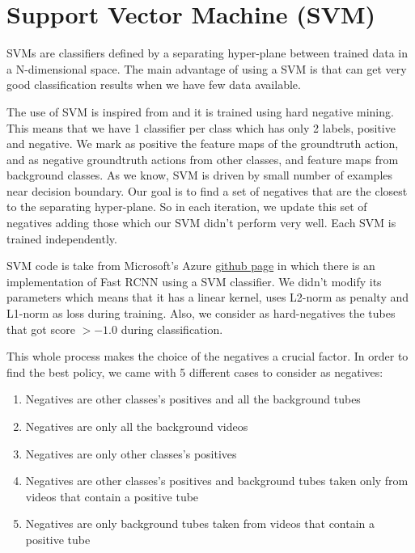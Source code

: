 \section{Support Vector Machine (SVM)}
SVMs are classifiers defined by a separating hyper-plane between trained data in a N-dimensional space. The main advantage of using a SVM
is that can get very good classification results when we have few data available. \par
The use of SVM is inspired from \cite{Girshick:2015:FR:2919332.2920125} and it is trained using hard negative mining. 
This means that we have 1 classifier per class which has only 2 labels, positive and negative. We mark as positive the feature maps of the
groundtruth action, and as negative groundtruth actions from other classes, and feature maps from background classes.
As we know, SVM is driven by small number of examples near decision boundary. Our goal is to find a set of negatives that are the closest to
the separating hyper-plane. So in each iteration, we update this set of negatives adding those which our SVM didn't perform very well. Each
SVM is trained independently. \par
SVM code is take from Microsoft's Azure \href{https://github.com/Azure/ObjectDetectionUsingCntk} {github page} in which there is an implementation
of Fast RCNN using a SVM classifier. We didn't modify its parameters which means that it has a linear kernel, uses  L2-norm as penalty and L1-norm
as loss during training. Also, we consider as hard-negatives the tubes that got score $ >  -1.0 $ during classification.\par
This whole process makes the choice of the negatives a crucial factor. In order to find the best policy,  we came with 5 different cases to consider
as negatives:
\begin{enumerate}
\item Negatives are other classes's positives and all the background tubes
\item Negatives are only all the background videos
\item Negatives are only other classes's positives
\item Negatives are other classes's positives and background tubes taken only from videos that contain a positive tube
\item Negatives are only background tubes taken from videos that contain a positive tube
\end{enumerate}

